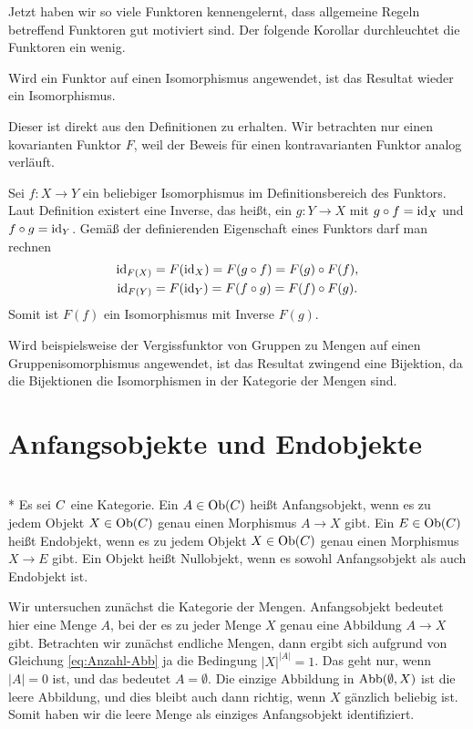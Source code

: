 Jetzt haben wir so viele Funktoren kennengelernt, dass allgemeine
Regeln betreffend Funktoren gut motiviert sind. Der folgende Korollar
durchleuchtet die Funktoren ein wenig.
\begin{Korollar}
Wird ein Funktor auf einen Isomorphismus angewendet, ist das Resultat
wieder ein Isomorphismus.
\end{Korollar}
 Dieser ist direkt aus den Definitionen zu erhalten.
Wir betrachten nur einen kovarianten Funktor $F$, weil der Beweis für
einen kontravarianten Funktor analog verläuft.

Sei $f\colon X\to Y$ ein beliebiger Isomorphismus im Definitionsbereich
des Funktors. Laut Definition existert eine Inverse, das heißt, ein
$g\colon Y\to X$ mit $g\circ f = \operatorname{id}_X$ und $f\circ g = \operatorname{id}_Y$. Gemäß
der definierenden Eigenschaft eines Funktors darf man rechnen
\begin{gather*}
\operatorname{id}_{F(X)} = F(\operatorname{id}_X) = F(g\circ f) = F(g)\circ F(f),\\
\operatorname{id}_{F(Y)} = F(\operatorname{id}_Y) = F(f\circ g) = F(f)\circ F(g).
\end{gather*}
Somit ist $F(f)$ ein Isomorphismus mit Inverse $F(g)$.\,\qedsymbol

Wird beispielsweise der Vergissfunktor von Gruppen zu Mengen auf
einen Gruppenisomorphismus angewendet, ist das Resultat zwingend
eine Bijektion, da die Bijektionen die Isomorphismen in der Kategorie
der Mengen sind.

\section{Anfangsobjekte und Endobjekte}

\begin{Definition}\mbox{}\\*
Es sei $C$ eine Kategorie. Ein
$A\in\operatorname{Ob}(C)$ heißt Anfangsobjekt, wenn
es zu jedem Objekt $X\in\operatorname{Ob}(C)$ genau einen
Morphismus $A\to X$ gibt.
Ein $E\in\operatorname{Ob}(C)$ heißt Endobjekt, wenn
es zu jedem Objekt $X\in\operatorname{Ob}(C)$ genau einen
Morphismus $X\to E$ gibt. Ein Objekt heißt Nullobjekt, wenn
es sowohl Anfangsobjekt als auch Endobjekt ist.
\end{Definition}

\noindent
{}
Wir untersuchen zunächst die Kategorie der Mengen. Anfangsobjekt
bedeutet hier eine Menge $A$, bei der es zu jeder Menge $X$ genau
eine Abbildung $A\to X$ gibt. Betrachten wir zunächst endliche
Mengen, dann ergibt sich aufgrund von Gleichung \eqref{eq:Anzahl-Abb}
ja die Bedingung $|X|^{|A|}=1$. Das geht nur, wenn $|A|=0$ ist,
und das bedeutet $A=\emptyset$. Die einzige Abbildung in $\operatorname{Abb}(\emptyset,X)$
ist die leere Abbildung, und dies bleibt auch dann richtig, wenn
$X$ gänzlich beliebig ist. Somit haben wir die leere Menge als
einziges Anfangsobjekt identifiziert.

